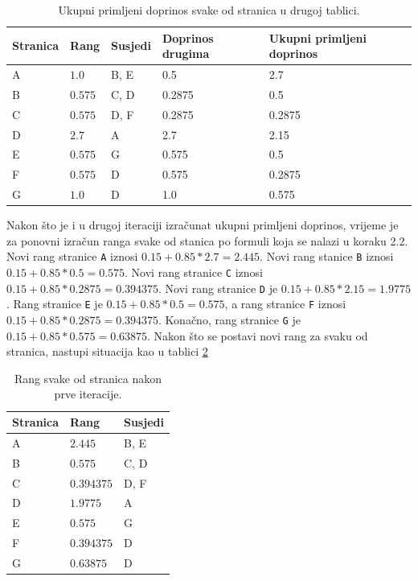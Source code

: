 \documentclass[times, utf8, zavrsni, numeric]{fer}
\begin{document}
\begin{table}[htb]
\caption{Ukupni primljeni doprinos svake od stranica u drugoj tablici.}
\label{tbl:pageRankKorak22ap2}
\centering
\begin{tabular}{lllll} 
\hline
Stranica & Rang & Susjedi & Doprinos drugima & Ukupni primljeni doprinos\\
\hline
A & $1.0$ & B, E & 0.5 & 2.7\\
B & $0.575$ & C, D & 0.2875 & 0.5\\
C & $0.575$ & D, F & 0.2875 & 0.2875\\
D & $2.7$ & A & 2.7 & 2.15\\
E & $0.575$ & G & 0.575 & 0.5\\
F & $0.575$ & D & 0.575 & 0.2875\\
G & $1.0$ & D & 1.0 & 0.575\\
\hline
\end{tabular}
\end{table}

Nakon što je i u drugoj iteraciji izračunat ukupni primljeni doprinos, vrijeme je za ponovni izračun ranga svake od stanica po formuli koja se nalazi u koraku 2.2. Novi rang stranice \texttt{A} iznosi $0.15 + 0.85 * 2.7 = 2.445$. Novi rang stanice \texttt{B} iznosi $0.15 + 0.85 * 0.5 = 0.575$. Novi rang stranice \texttt{C} iznosi $0.15 + 0.85 * 0.2875 = 0.394375 $. Novi rang stranice \texttt{D} je $0.15 + 0.85 * 2.15 = 1.9775$.
Rang stranice \texttt{E} je $0.15 + 0.85 * 0.5 = 0.575$, a rang stranice \texttt{F} iznosi $0.15 + 0.85 * 0.2875 = 0.394375$. Konačno, rang stranice \texttt{G} je $0.15 + 0.85 * 0.575 = 0.63875$. Nakon što se postavi novi rang za svaku od stranica, nastupi situacija kao u tablici \ref{tbl:pageRankStanje2}

\begin{table}[htb]
\caption{Rang svake od stranica nakon prve iteracije.}
\label{tbl:pageRankStanje2}
\centering
\begin{tabular}{lll} 
\hline
Stranica & Rang & Susjedi \\
\hline
A & $2.445$ & B, E\\
B & $0.575$ & C, D\\
C & $0.394375$ & D, F\\
D & $1.9775$ & A\\
E & $0.575$ & G\\
F & $0.394375$ & D\\
G & $0.63875$ & D\\
\hline
\end{tabular}
\end{table}
\end{document}
